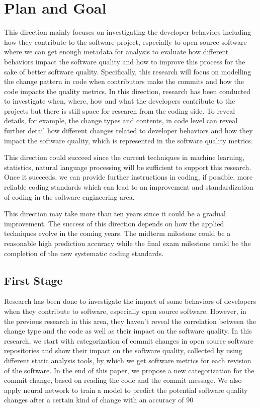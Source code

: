 \section{Plan and Goal}
\label{sec:goal}

This direction mainly focuses on investigating the developer behaviors including how they contribute to the software project, especially to open source software where we can get enough metadata for analysis to evaluate how different behaviors impact the software quality and how to improve this process for the sake of better software quality. Specifically, this research will focus on modelling the change pattern in code when contributors make the commits and how the code impacts the quality metrics. In this direction, research has been conducted to investigate when, where, how and what the developers contribute to the projects but there is still space for research from the coding side. To reveal details, for example, the change types and contents, in code level can reveal further detail how different changes related to developer behaviors and how they impact the software quality, which is represented in the software quality metrics.

This direction could succeed since the current techniques in machine learning, statistics, natural language processing will be sufficient to support this research. Once it succeeds, we can provide further instructions in coding, if possible, more reliable coding standards which can lead to an improvement and standardization of coding in the software engineering area.

This direction may take more than ten years since it could be a gradual improvement. The success of this direction depends on how the applied techniques evolve in the coming years. The midterm milestone could be a reasonable high prediction accuracy while the final exam milestone could be the completion of the new systematic coding standards.


\subsection{First Stage}
Research has been done to investigate the impact of some behaviors of developers when they contribute to software, especially open source software. However, in the previous research in this area, they haven't reveal the correlation between the change type and the code as well as their impact on the software quality. In this research, we start with categorization of commit changes in open source software repositories and show their impact on the software quality, collected by using different static analysis tools, by which we get software metrics for each revision of the software. In the end of this paper, we propose a new categorization for the commit change, based on reading the code and the commit message. We also apply neural network to train a model to predict the potential software quality changes after a certain kind of change with an accuracy of 90%


